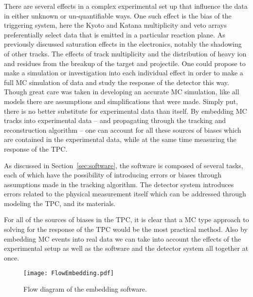 There are several effects in a complex experimental set up that influence the data in either unknown or un-quantifiable ways. One such effect is the bias of the triggering system, here the Kyoto and Katana multiplicity and veto arrays preferentially select data that is emitted in a particular reaction plane. As previously discussed saturation effects in the electronics, notably the shadowing of other tracks. The effects of track multiplicity and the distribution of heavy ion and residues from the breakup of the target and projectile. One could propose to make a simulation or investigation into each individual effect in order to make a full MC simulation of data and study the response of the detector this way. Though great care was taken in developing an accurate MC simulation, like all models there are assumptions and simplifications that were made. Simply put, there is no better substitute for experimental data than itself. By embedding MC tracks into experimental data -- and propagating through the tracking and reconstruction algorithm -- one can account for all these sources of biases which are contained in the experimental data, while at the same time measuring the response of the TPC.

As discussed in Section~\ref{sec:software}, the software is composed of several tasks, each of which have the possibility of introducing errors or biases through assumptions made in the tracking algorithm. The detector system introduces errors related to the physical measurement itself which can be addressed through modeling the TPC, and its materials. 

For all of the sources of biases in the TPC, it is clear that a MC type approach to solving for the response of the TPC would be the most practical method. Also by embedding MC events into real data we can take into account the effects of the experimental setup as well as the software and the detector system all together at once. 



\begin{figure}[!htb]
\centering
\texttt{[image: FlowEmbedding.pdf]}
\caption{Flow diagram of the embedding software.}
\label{fig:flow}
\end{figure}

